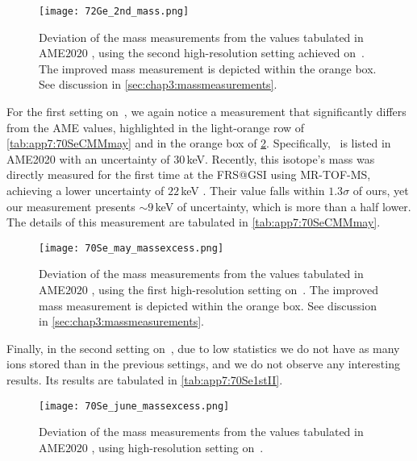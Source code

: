   \begin{figure}
    \centering
    \texttt{[image: 72Ge\_2nd\_mass.png]}
    \caption{Deviation of the mass measurements from the values tabulated in \textsc{AME$2020$} \cite{AME-2020}, using the second high-resolution setting achieved on \,. The improved mass measurement is depicted within the orange box. See discussion in \cref{sec:chap3:massmeasurements}.}
    \label{fig:chap3:mass72Ge2}
  \end{figure}
    
  For the first setting on \,, we again notice a measurement that significantly differs from the \textsc{AME} values, highlighted in the light-orange row of \cref{tab:app7:70SeCMMmay} and in the orange box of \cref{fig:chap3:mass70SeMay}. Specifically, \, is listed in \textsc{AME2020} \cite{AME-2020} with an uncertainty of $30$\,keV. Recently, this isotope's mass was directly measured for the first time at the \textsc{FRS@GSI} using \textsc{MR-TOF-MS}, achieving a lower uncertainty of $22$\,keV \cite{PhysRevC.103.034319}. Their value falls within $1.3\sigma$ of ours, yet our measurement presents $\sim9$\,keV of uncertainty, which is more than a half lower.
  The details of this measurement are tabulated in \cref{tab:app7:70SeCMMmay}.

    \begin{figure}
    \centering
    \texttt{[image: 70Se\_may\_massexcess.png]}
    \caption{Deviation of the mass measurements from the values tabulated in \textsc{AME$2020$} \cite{AME-2020}, using the first high-resolution setting on \,. The improved mass measurement is depicted within the orange box. See discussion in \cref{sec:chap3:massmeasurements}.}
    \label{fig:chap3:mass70SeMay}
    \end{figure}
    
    Finally, in the second setting on \,, due to low statistics we do not have as many ions stored than in the previous settings, and we do not observe any interesting results. Its results are tabulated in \cref{tab:app7:70Se1stII}.
    \begin{figure}
    \centering
    \texttt{[image: 70Se\_june\_massexcess.png]}
    \caption{Deviation of the mass measurements from the values tabulated in \textsc{AME$2020$} \cite{AME-2020}, using high-resolution setting on \,.}
    \label{fig:chap3:mass70SeJune}
    \end{figure}
    
